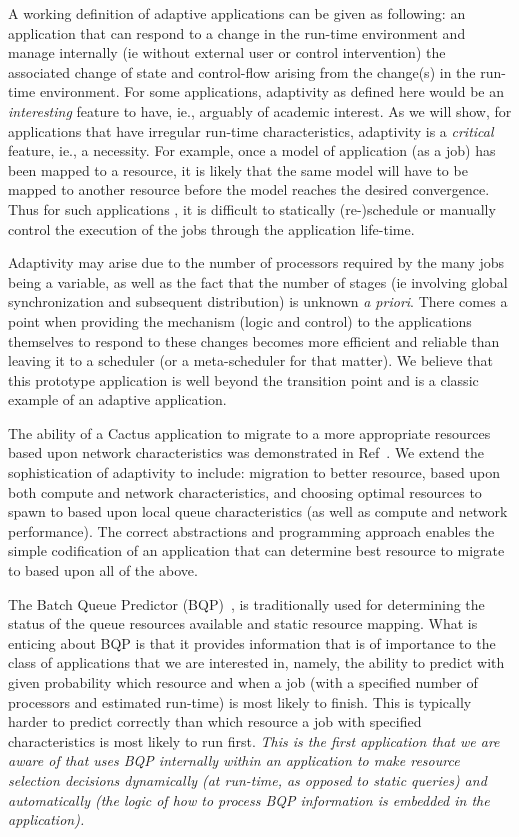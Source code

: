 \documentclass[conference,final]{IEEEtran}
\begin{document}
A working definition of adaptive applications can be given as
following: an application that can respond to a change in the run-time
environment and manage internally (ie without external user or control
intervention) the associated change of state and control-flow arising
from the change(s) in the run-time environment.  For some
applications, adaptivity as defined here would be an {\it interesting}
feature to have, ie., arguably of academic interest. As we will show,
for applications that have irregular run-time characteristics,
adaptivity is a {\it critical} feature, ie., a necessity.  For
example, once a model of application (as a job) has been mapped to a
resource, it is likely that the same model will have to be mapped to
another resource before the model reaches the desired convergence.
Thus for such applications , it is difficult to statically
(re-)schedule or manually control the execution of the jobs through
the application life-time.

Adaptivity may arise due to the number of processors required by the
many jobs being a variable, as well as the fact that the number of
stages (ie involving global synchronization and subsequent
distribution) is unknown {\it a priori}. There comes a point when
providing the mechanism (logic and control) to the applications
themselves to respond to these changes becomes more efficient and
reliable than leaving it to a scheduler (or a meta-scheduler for that
matter). We believe that this prototype application is well beyond the
transition point and is a classic example of an adaptive application.

The ability of a Cactus application to migrate to a more appropriate
resources based upon network characteristics was demonstrated in
Ref~\cite{escience07}.  We extend the sophistication of adaptivity to
include: migration to better resource, based upon both compute and
network characteristics, and choosing optimal resources to spawn to
based upon local queue characteristics (as well as compute and network
performance). The correct abstractions and programming approach
enables the simple codification of an application that can determine
best resource to migrate to based upon all of the above.

 The Batch
Queue Predictor (BQP)~\cite{bqp, bqp_url}, is traditionally used for
determining the status of the queue resources available and static
resource mapping. What is enticing about BQP is that it provides
information that is of importance to the class of applications that we
are interested in, namely, the ability to predict with given
probability which resource and when a job (with a specified number of
processors and estimated run-time) is most likely to finish.  This is
typically harder to predict correctly than which resource a job with
specified characteristics is most likely to run first.  {\it This is
  the first application that we are aware of that uses BQP internally
  within an application to make resource selection decisions
  dynamically (at run-time, as opposed to static queries) and
  automatically (the logic of how to process BQP information is
  embedded in the application).}
\end{document}
